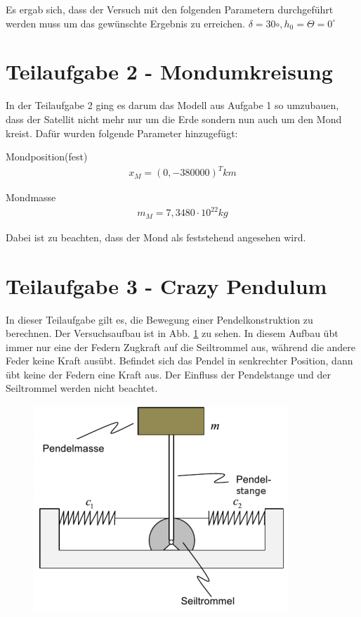 \documentclass[]{scrartcl}
\begin{document}
Es ergab sich, dass der Versuch mit den folgenden Parametern durchgeführt werden muss um das gewünschte Ergebnis zu erreichen.
 $\delta = 30\circ, h_0 =  \Theta = 0^\circ $ 


\section{Teilaufgabe 2 - Mondumkreisung}
In der Teilaufgabe 2 ging es darum das Modell aus Aufgabe 1 so umzubauen, dass der Satellit nicht mehr nur um die Erde sondern nun auch um den Mond kreist. Dafür wurden folgende Parameter hinzugefügt:

Mondposition(fest)
\begin{align}
x_{M} = (0,-380000)^T km
\end{align}

Mondmasse
\begin{align}
m_{M} = 7,3480 \cdot 10^{22} kg
\end{align}

Dabei ist zu beachten, dass der Mond als feststehend angesehen wird.


\section{Teilaufgabe 3 - Crazy Pendulum}
In dieser Teilaufgabe gilt es, die Bewegung einer Pendelkonstruktion zu berechnen. Der Versuchsaufbau ist in Abb. \ref{fig:3_Versuchsaufbau} zu sehen. In diesem Aufbau übt immer nur eine der Federn Zugkraft auf die Seiltrommel aus, während die andere Feder keine Kraft ausübt. Befindet sich das Pendel in senkrechter Position, dann übt keine der Federn eine Kraft aus. Der Einfluss der Pendelstange und der Seiltrommel werden nicht beachtet.

\begin{figure}[H]
\centering
\includegraphics[width=0.5\linewidth]{./3_Versuchsaufbau}
\caption{}
\label{fig:3_Versuchsaufbau}
\end{figure}
\end{document}

